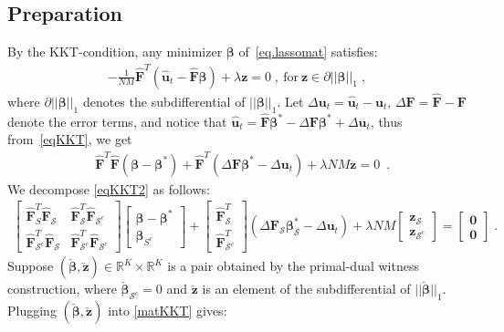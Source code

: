 \documentclass[a4paper,11pt]{article}
\newcommand{\bbeta}{\bm{\beta}}
\newcommand{\bF}{\mathbf{F}}
\newcommand{\mS}{\mathcal{S}}
\newcommand{\bu}{\mathbf{u}}
\begin{document}
\subsection{Preparation}
By the KKT-condition, any minimizer $\bbeta$ of~\eqref{eq.lassomat} satisfies:
\begin{align}
-\frac{1}{NM}\widehat{\bF}^T(\widehat{\bu}_t-\widehat{\bF}\bbeta)+\lambda \mathbf{z}=0\;,~\text{for}~\mathbf{z}\in\partial||\bbeta||_1\;,\label{eqKKT}
\end{align}
where $\partial||\bbeta||_1$ denotes the subdifferential of $||\bbeta||_1$. Let $\Delta \bu_t=\widehat{\bu}_t-\bu_t$, $\Delta \bF=\widehat{\bF}-\bF$ denote the error terms, and notice that $\widehat{\bu}_t=\widehat{\bF}\bbeta^*-\Delta \bF\bbeta^*+\Delta \bu_t$, thus from~\eqref{eqKKT}, we get
\begin{align}
&\widehat{\bF}^T\widehat{\bF}(\bbeta-\bbeta^*)+\widehat{\bF}^T(\Delta \bF\bbeta^*-\Delta \bu_t)+\lambda NM\mathbf{z}=0\;~\label{eqKKT2}.
\end{align}
We decompose \eqref{eqKKT2} as follows:
\begin{align}
\begin{bmatrix}
\widehat{\bF}^T_S\widehat{\bF}_\mS&\widehat{\bF}^T_\mS\widehat{\bF}_{\mS^c}\\
\widehat{\bF}^T_{\mS^c}\widehat{\bF}_\mS&\widehat{\bF}^T_{\mS^c}\widehat{\bF}_{\mS^c}
\end{bmatrix}\begin{bmatrix}
\bbeta-\bbeta^*\\
\bbeta_{S^c}
\end{bmatrix}
+\begin{bmatrix}
\widehat{\bF}_\mS^T\\
\widehat{\bF}_{\mS^c}^T
\end{bmatrix}(\Delta \bF_\mS\bbeta_\mS^*-\Delta \bu_t)
+\lambda NM\begin{bmatrix}
\mathbf{z}_\mS\\
\mathbf{z}_{\mS^c}
\end{bmatrix}=\begin{bmatrix}
	\mathbf{0}\\\mathbf{0}
\end{bmatrix}\;.\label{matKKT}
\end{align}
Suppose $(\check{\bbeta},\check{\mathbf{z}})\in\mathbb{R}^K\times\mathbb{R}^K$ is a pair obtained by the primal-dual witness construction, where $\check{\bbeta}_{\mS^c}=0$ and $\check{\mathbf{z}}$ is an element of the subdifferential of $||\check{\bbeta}||_1$.  Plugging $(\check{\bbeta},\check{\mathbf{z}})$ into \eqref{matKKT} gives:
\end{document}
